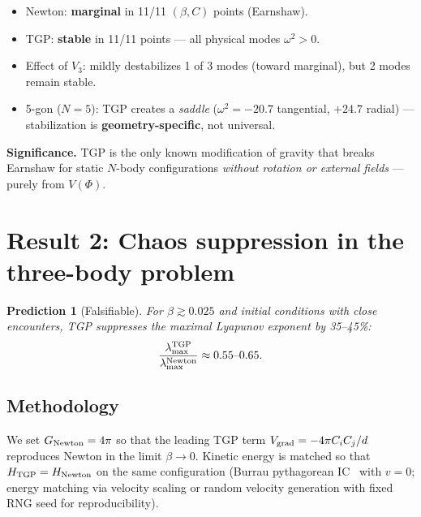 \documentclass[11pt,a4paper]{article}
\def\textup#1{#1}%
\newcommand{\lmax}{\lambda_{\max}}
\newtheorem{prediction}{Prediction}
\begin{document}
\begin{itemize}[nosep]
  \item Newton: \textbf{marginal} in 11/11 $(\beta, C)$ points (Earnshaw).
  \item TGP: \textbf{stable} in 11/11 points --- all physical modes
        $\omega^2 > 0$.
  \item Effect of $V_3$: mildly destabilizes 1 of 3 modes (toward marginal),
        but 2 modes remain stable.
  \item 5-gon ($N=5$): TGP creates a \emph{saddle} ($\omega^2 = -20.7$
        tangential, $+24.7$ radial) --- stabilization is
        \textbf{geometry-specific}, not universal.
\end{itemize}

\medskip
\noindent\textbf{Significance.}  TGP is the only known modification of
gravity that breaks Earnshaw for static $N$-body configurations
\emph{without rotation or external fields} --- purely from $V(\Phi)$.

\section{Result 2: Chaos suppression in the three-body problem}
\label{sec:chaos}

\begin{prediction}[Falsifiable]
For $\beta \gtrsim 0.025$ and initial conditions with close encounters,
TGP suppresses the maximal Lyapunov exponent by 35--45\%\textup{:}
\begin{equation}
  \frac{\lmax^{\rm TGP}}{\lmax^{\rm Newton}} \approx 0.55\text{--}0.65.
  \label{eq:ratio}
\end{equation}
\end{prediction}

\subsection{Methodology}

We set $G_{\rm Newton} = 4\pi$ so that the leading TGP term
$V_{\rm grad} = -4\pi C_i C_j / d$ reproduces Newton in the limit
$\beta \to 0$.  Kinetic energy is matched so that
$H_{\rm TGP} = H_{\rm Newton}$ on the same configuration (Burrau
pythagorean IC~\citep{Burrau1913,Szebehely1967} with $v = 0$; energy matching via velocity scaling or
random velocity generation with fixed RNG seed for reproducibility).
\end{document}
